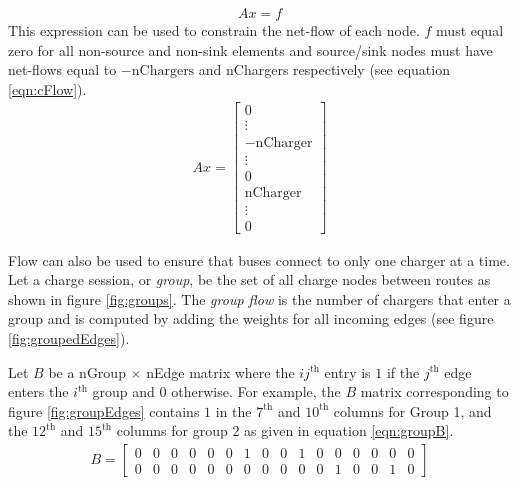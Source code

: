 \begin{align}
	Ax = f
\end{align}
This expression can be used to constrain the net-flow of each node.  $f$ must equal zero for all non-source and non-sink elements and source/sink nodes must have net-flows equal to $-\text{nChargers}$ and nChargers respectively (see equation \ref{eqn:cFlow}).
\begin{align}\label{eqn:cFlow}
	Ax = \begin{bmatrix} 0 \\ \vdots \\ -\text{nCharger} \\ \vdots \\ 0 \\ \text{nCharger} \\ \vdots \\ 0\end{bmatrix}
\end{align}

\par Flow can also be used to ensure that buses connect to only one charger at a time. Let a charge session, or \textit{group}, be the set of all charge nodes between routes as shown in figure \ref{fig:groups}. The \textit{group flow} is the number of chargers that enter a group and is computed by adding the weights for all incoming edges (see figure \ref{fig:groupedEdges}). 
\par Let $B$ be a nGroup $\times$ nEdge matrix where the $ij^{\text{th}}$ entry is $1$ if the $j^{\text{th}}$ edge enters the $i^{\text{th}}$ group and $0$ otherwise. For example, the $B$ matrix corresponding to figure \ref{fig:groupEdges} contains $1$ in the $7^{\text{th}}$ and $10^{\text{th}}$ columns for Group 1, and the $12^{\text{th}}$ and $15^{\text{th}}$ columns for group 2 as given in equation \ref{eqn:groupB}.
\begin{align}\label{eqn:groupB}
	B = \begin{bmatrix}0 & 0 & 0 & 0 & 0 & 0 & 1 & 0 & 0 & 1 & 0 & 0 & 0 & 0 & 0 & 0\\
	                   0 & 0 & 0 & 0 & 0 & 0 & 0 & 0 & 0 & 0 & 0 & 1 & 0 & 0 & 1 & 0\end{bmatrix}
\end{align}

